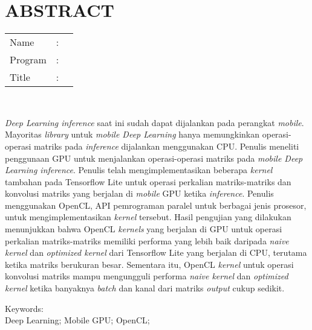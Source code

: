 %
%
%

\chapter*{ABSTRACT}

\vspace*{0.2cm}

\noindent \begin{tabular}{l l p{11.0cm}}
	Name&: & \penulis \\
	Program&: & \programInggris \\
	Title&: & \judulInggris \\
\end{tabular} \\ 

\vspace*{0.5cm}

\noindent 
\textit{Deep Learning inference} saat ini sudah dapat dijalankan pada perangkat \textit{mobile}. Mayoritas \textit{library} untuk \textit{mobile Deep Learning} hanya memungkinkan operasi-operasi matriks pada \textit{inference} dijalankan menggunakan CPU. Penulis meneliti penggunaan GPU untuk menjalankan operasi-operasi matriks pada \textit{mobile Deep Learning inference}. Penulis telah mengimplementasikan beberapa \textit{kernel} tambahan pada Tensorflow Lite untuk operasi perkalian matriks-matriks dan konvolusi matriks yang berjalan di \textit{mobile} GPU ketika \textit{inference}. Penulis menggunakan OpenCL, API pemrograman paralel untuk berbagai jenis prosesor, untuk mengimplementasikan \textit{kernel} tersebut. Hasil pengujian yang dilakukan menunjukkan bahwa OpenCL \textit{kernels} yang berjalan di GPU untuk operasi perkalian matriks-matriks memiliki performa yang lebih baik daripada \textit{naive kernel} dan \textit{optimized kernel} dari Tensorflow Lite yang berjalan di CPU, terutama ketika matriks berukuran besar. Sementara itu, OpenCL \textit{kernel} untuk operasi konvolusi matriks mampu mengungguli performa \textit{naive kernel} dan \textit{optimized kernel} ketika banyaknya \textit{batch} dan kanal dari matriks \textit{output} cukup sedikit.
\\

\vspace*{0.2cm}

\noindent Keywords: \\ 
\noindent Deep Learning; Mobile GPU; OpenCL; \\

\newpage